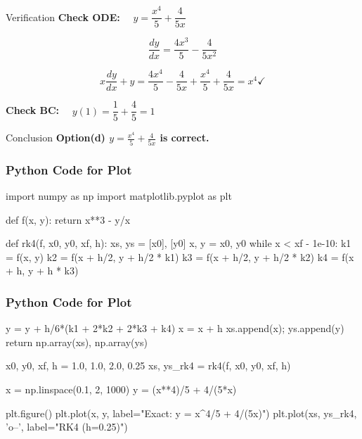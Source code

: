 \documentclass{beamer}
\begin{document}
\begin{frame}{Verification}
\textbf{Check ODE:} $\quad y = \dfrac{x^4}{5} + \dfrac{4}{5x}$

\[
\frac{dy}{dx} = \frac{4x^3}{5} - \frac{4}{5x^2}
\]

\[
x\frac{dy}{dx} + y
  = \frac{4x^4}{5} - \frac{4}{5x} + \frac{x^4}{5} + \frac{4}{5x}
  = x^4 \checkmark
\]

\vspace{0.4em}
\textbf{Check BC:} $\quad y(1) = \dfrac{1}{5} + \dfrac{4}{5} = 1$ \checkmark

\vspace{0.6em}
\begin{block}{Conclusion}
\textbf{Option(d)  $\displaystyle y = \frac{x^4}{5} + \frac{4}{5x}$ is correct.}\\

\end{block}
\end{frame}

\begin{frame}[fragile]
\frametitle{Python Code for Plot}

\begin{mycode}
import numpy as np
import matplotlib.pyplot as plt

def f(x, y):
    return x**3 - y/x

def rk4(f, x0, y0, xf, h):
    xs, ys = [x0], [y0]
    x, y = x0, y0
    while x < xf - 1e-10:
        k1 = f(x, y)
        k2 = f(x + h/2, y + h/2 * k1)
        k3 = f(x + h/2, y + h/2 * k2)
        k4 = f(x + h, y + h * k3)
       
\end{mycode}

\end{frame}

\begin{frame}[fragile]
\frametitle{Python Code for Plot}

\begin{mycode}

 y = y + h/6*(k1 + 2*k2 + 2*k3 + k4)
        x = x + h
        xs.append(x); ys.append(y)
    return np.array(xs), np.array(ys)
    
x0, y0, xf, h = 1.0, 1.0, 2.0, 0.25
xs, ys_rk4 = rk4(f, x0, y0, xf, h)

x = np.linspace(0.1, 2, 1000)
y = (x**4)/5 + 4/(5*x)

plt.figure()
plt.plot(x, y, label="Exact: y = x^4/5 + 4/(5x)")
plt.plot(xs, ys_rk4, 'o--', label="RK4 (h=0.25)")

\end{mycode}

\end{frame}
\end{document}
